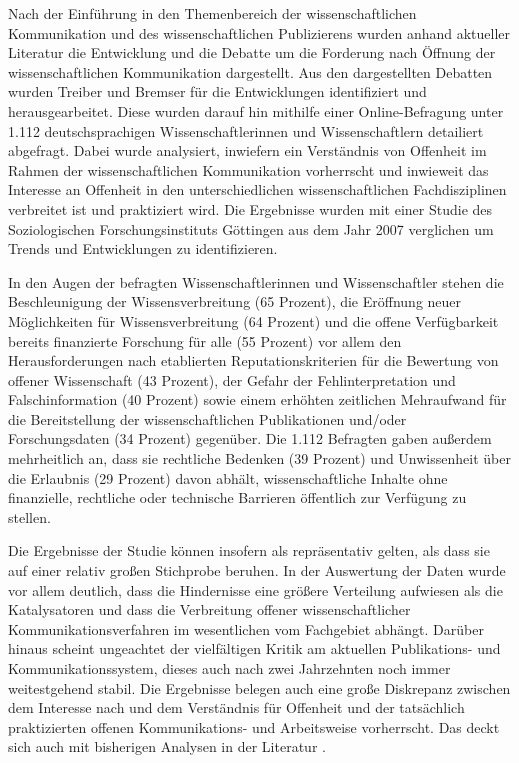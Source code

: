 Nach der Einführung in den Themenbereich der wissenschaftlichen Kommunikation und des wissenschaftlichen Publizierens wurden anhand aktueller Literatur die Entwicklung und die Debatte um die Forderung nach Öffnung der wissenschaftlichen Kommunikation dargestellt. Aus den dargestellten Debatten wurden Treiber und Bremser für die Entwicklungen identifiziert und herausgearbeitet. Diese wurden darauf hin mithilfe einer Online-Befragung unter 1.112 deutschsprachigen Wissenschaftlerinnen und Wissenschaftlern detailiert abgefragt. Dabei wurde analysiert, inwiefern ein Verständnis von Offenheit im Rahmen der wissenschaftlichen Kommunikation vorherrscht und inwieweit das Interesse an Offenheit in den unterschiedlichen wissenschaftlichen Fachdisziplinen verbreitet ist und praktiziert wird. Die Ergebnisse wurden mit einer Studie des Soziologischen Forschungsinstituts Göttingen aus dem Jahr 2007 verglichen um Trends und Entwicklungen zu identifizieren.

In den Augen der befragten Wissenschaftlerinnen und Wissenschaftler stehen die Beschleunigung der Wissensverbreitung (65 Prozent), die Eröffnung neuer Möglichkeiten für Wissensverbreitung (64 Prozent) und die offene Verfügbarkeit bereits finanzierte Forschung für alle (55 Prozent) vor allem den Herausforderungen nach etablierten Reputationskriterien für die Bewertung von offener Wissenschaft (43 Prozent), der Gefahr der Fehlinterpretation und Falschinformation (40 Prozent) sowie einem erhöhten zeitlichen Mehraufwand für die Bereitstellung der wissenschaftlichen Publikationen und/oder Forschungsdaten (34 Prozent) gegenüber. Die 1.112 Befragten gaben außerdem mehrheitlich an, dass sie rechtliche Bedenken (39 Prozent) und Unwissenheit über die Erlaubnis (29 Prozent) davon abhält, wissenschaftliche Inhalte ohne finanzielle, rechtliche oder technische Barrieren öffentlich zur Verfügung zu stellen.

Die Ergebnisse der Studie können insofern als repräsentativ gelten, als dass sie auf einer relativ großen Stichprobe beruhen. In der Auswertung der Daten wurde vor allem deutlich, dass die Hindernisse eine größere Verteilung aufwiesen als die Katalysatoren und dass die Verbreitung offener wissenschaftlicher Kommunikationsverfahren im wesentlichen vom Fachgebiet abhängt. Darüber hinaus scheint ungeachtet der vielfältigen Kritik am aktuellen Publikations- und Kommunikationssystem, dieses auch nach zwei Jahrzehnten noch immer weitestgehend stabil. Die Ergebnisse belegen auch eine große Diskrepanz zwischen dem Interesse nach und dem Verständnis für Offenheit und der tatsächlich praktizierten offenen Kommunikations- und Arbeitsweise vorherrscht. Das deckt sich auch mit bisherigen Analysen in der Literatur \cite{yiotis_2013_open} \cite{Bartling_2013} \cite{hagner_2015_sache_buches} \cite{Fecher_2015}.


